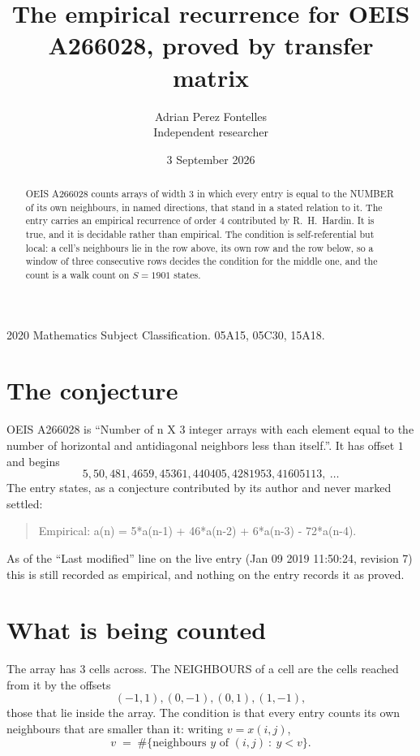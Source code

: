 \documentclass[11pt,a4paper]{article}
\title{The empirical recurrence for OEIS A266028, proved by transfer matrix}
\author{Adrian Perez Fontelles\\ \small Independent researcher}
\date{3 September 2026}
\theoremstyle{plain}
\theoremstyle{definition}
\begin{document}
\maketitle

\begin{abstract}
OEIS A266028 counts arrays of width $3$ in which every entry is equal to the NUMBER of its own
neighbours, in named directions, that stand in a stated relation to it. The entry carries an
empirical recurrence of order $4$ contributed by R.~H.~Hardin. It is true, and it is
decidable rather than empirical. The condition is self-referential but local: a cell's
neighbours lie in the row above, its own row and the row below, so a window of three
consecutive rows decides the condition for the middle one, and the count is a walk count on
$S=1901$ states.
\end{abstract}

\noindent\small 2020 Mathematics Subject Classification. 05A15, 05C30, 15A18.\normalsize

\section{The conjecture}

OEIS A266028 is ``Number of n X 3 integer arrays with each element equal to the number of horizontal and antidiagonal neighbors less than itself.''. It has offset $1$ and begins
\[
5, 50, 481, 4659, 45361, 440405, 4281953, 41605113,\ \dots
\]
The entry states, as a conjecture contributed by its author and never marked settled:
\begin{quote}
Empirical: a(n) = 5*a(n-1) + 46*a(n-2) + 6*a(n-3) - 72*a(n-4).
\end{quote}
As of the ``Last modified'' line on the live entry (Jan 09 2019 11:50:24, revision 7) this is still
recorded as empirical, and nothing on the entry records it as proved.

\section{What is being counted}

The array has $3$ cells across. The NEIGHBOURS of a cell are the cells reached from it by the
offsets
\[
(-1,1), (0,-1), (0,1), (1,-1),
\]
those that lie inside the array. The condition is that every entry counts its own neighbours
that are smaller than it: writing $v=x(i,j)$,
\[
v\;=\;\#\{\text{neighbours } y \text{ of } (i,j)\ :\ y<v\} .
\]
\end{document}
